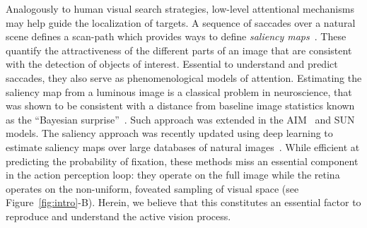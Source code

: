 Analogously to human visual search strategies, low-level attentional mechanisms may help guide the localization of targets. A sequence of saccades over a natural scene defines a scan-path which provides ways to define \emph{saliency maps}~\cite{Itti01}. These quantify the attractiveness of the different parts of an image that are consistent with the detection of objects of interest. Essential to understand and predict saccades, they also serve as phenomenological models of attention. Estimating the saliency map from a luminous image is a classical problem in neuroscience, that was shown to be consistent with a distance from baseline image statistics known as the ``Bayesian surprise''~\cite{Itti2009}. Such approach was extended in the AIM~\cite{Bruce2009} and SUN~\cite{Zhang2008} models. The saliency approach was recently updated using deep learning to estimate saliency maps over large databases of natural images~\cite{Kummerer17}. While efficient at predicting the probability of fixation, these methods miss an essential component in the action perception loop: they operate on the full image while the retina operates on the non-uniform, foveated sampling of visual space (see Figure~\ref{fig:intro}-B). Herein, we believe that this constitutes an essential factor to reproduce and understand the active vision process.

